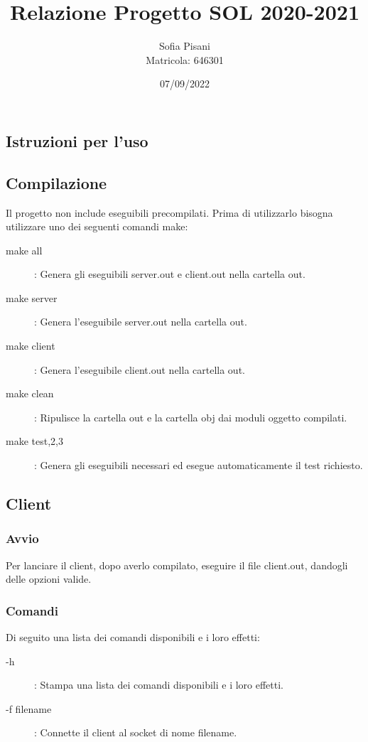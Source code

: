 \documentclass[11pt]{article}
\title{Relazione Progetto SOL 2020-2021}
\date{07/09/2022}
\author{Sofia Pisani \\ Matricola: 646301}
\begin{document}
\maketitle
{}
\newpage
\tableofcontents
\newpage
{}
\begin{flushleft}
\section{Istruzioni per l'uso}
\subsection{Compilazione}
Il progetto non include eseguibili precompilati. Prima di utilizzarlo bisogna utilizzare uno dei seguenti comandi make:
\begin{description}
\item[make all] : Genera gli eseguibili server.out e client.out nella cartella out.
\item[make server] : Genera l'eseguibile server.out nella cartella out.
\item[make client] : Genera l'eseguibile client.out nella cartella out.
\item[make clean] : Ripulisce la cartella out e la cartella obj dai moduli oggetto compilati.
\item[make test,2,3\rbrack]: Genera gli eseguibili necessari ed esegue automaticamente il test richiesto.
\end{description}
\subsection{Client}
\subsubsection{Avvio}
Per lanciare il client, dopo averlo compilato, eseguire il file client.out, dandogli delle opzioni valide.
\subsubsection{Comandi}
Di seguito una lista dei comandi disponibili e i loro effetti:
\begin{description}

\item[-h] : Stampa una lista dei comandi disponibili e i loro effetti.

\item[-f filename]: Connette il client al socket di nome filename.


\end{description}
\end{flushleft}
\end{document}
